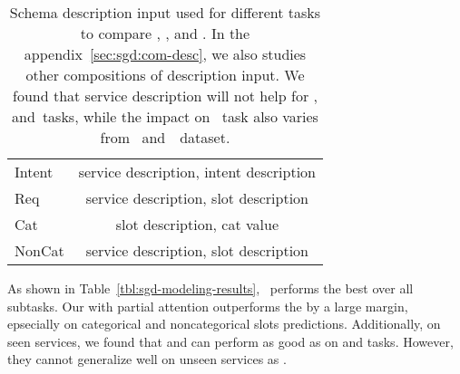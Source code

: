 \begin{table}[!t]
\begin{center}{\small
\setlength{\tabcolsep}{3pt}
\begin{tabular}{l|c}
  \toprule
\hline
Intent & service description, intent description \\
Req    & service description, slot description   \\
Cat    & slot description, cat value             \\
NonCat & service description, slot description   \\
\hline
  \bottomrule
\end{tabular}}
\end{center}
\caption{\label{tbl:schema-seq} Schema description input used for
  different tasks to compare \DE, \CE, and \FE. In the
  appendix~\ref{sec:sgd:com-desc}, we also studies other compositions of
description input. We found that service description will not help for
\IC, \RSI and~\CSL tasks, while the impact on \NSL~task also varies
from \sgdst~and~\multiwoz~dataset.}
\end{table}


 As shown in Table~\ref{tbl:sgd-modeling-results},
\CE~performs the best over all subtasks. Our \FE with partial
attention outperforms the \DE by a large margin, epsecially on
categorical and noncategorical slots predictions. Additionally, on
seen services, we found that \DE and \FE can perform as good as \CE on
\IC and \RSI tasks. However, they cannot generalize well on unseen
services as \CE. %

